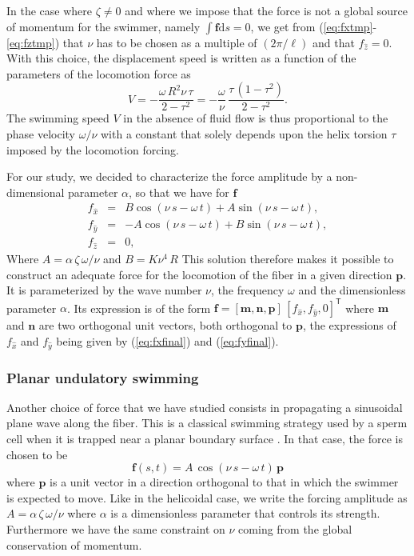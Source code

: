 \documentclass[aps,pre,reprint,superscriptaddress]{revtex4-2}
\newcommand{\bF}{\bm f}
\begin{document}
In the case where $\zeta\neq0$ and where we impose that the force is not a global source of momentum for the swimmer, namely $\int\bm f \mathrm{d}s = 0$, we get from (\ref{eq:fxtmp}-\ref{eq:fztmp}) that $\nu$ has to be chosen as a multiple of $(2\pi/\ell)$ and that $f_{\hat{z}} = 0$. With this choice, the displacement speed is written as a function of the parameters of the locomotion force as
\begin{equation}
  V = -\frac{\omega\,R^2\nu\,\tau}{2-\tau^2} = -\frac{\omega}{\nu} \, \frac{\tau\,(1-\tau^2)}{2-\tau^2}.
\end{equation}
The swimming speed $V$ in the absence of fluid flow is thus proportional to the phase velocity $\omega/\nu$ with a constant that solely depends upon the helix torsion $\tau$ imposed by the locomotion forcing.

For our study, we decided to characterize the force amplitude by a non-dimensional parameter $\alpha$, so that we have for $\bF$ 
\begin{eqnarray}
  f_{\hat{x}} &=& B\cos(\nu\,s-\omega\,t) + A\sin(\nu\,s-\omega\,t), \label{eq:fxfinal}\\
  f_{\hat{y}}&=& -A\cos(\nu\,s-\omega\,t)+B\sin(\nu\,s-\omega\,t), \label{eq:fyfinal}\\
   f_{\hat{z}} &=& 0 \label{eq:fzfinal},
 \end{eqnarray}
Where $A = \alpha\,\zeta\,\omega/\nu$ and $B=K\nu^4\,R$
This solution therefore makes it possible to construct an adequate force for the locomotion of the fiber in a given direction $\bm p$. It is parameterized by the wave number $\nu$, the frequency $\omega$ and the dimensionless parameter $\alpha$. Its expression is of the form $\bm f=[\bm m,\bm n,\bm p]\, [f_{\hat{x}}, f_{\hat{y}},0]^{\mathsf{T}} $ where $\bm m$ and $\bm n$ are two orthogonal unit vectors, both orthogonal to $\bm p$, the expressions of $f_{\hat{x}}$ and $f_{\hat{y}}$ being given by (\ref{eq:fxfinal}) and (\ref{eq:fyfinal}).

\subsubsection{Planar undulatory swimming}
Another choice of force that we have studied consists in propagating a sinusoidal plane wave along the fiber. 
This is a classical swimming strategy used by a sperm cell when it is trapped near a planar boundary surface \cite{nature,friedrich2010high}.
In that case, the force is chosen to be 
\begin{equation}
    \bF(s,t) = A\,\cos(\nu\,s-\omega\,t)\,\bm p
    \label{eq:sinusoidal_force}
\end{equation}
where $\bm p$ is a unit vector in a direction orthogonal to that in which the swimmer is expected to move. Like in the helicoidal case, we write the forcing amplitude as $A = \alpha\,\zeta\,\omega/\nu$ where $\alpha$ is a dimensionless parameter that controls its strength. Furthermore we have the same constraint on $\nu$ coming from the global conservation of momentum.
\end{document}
